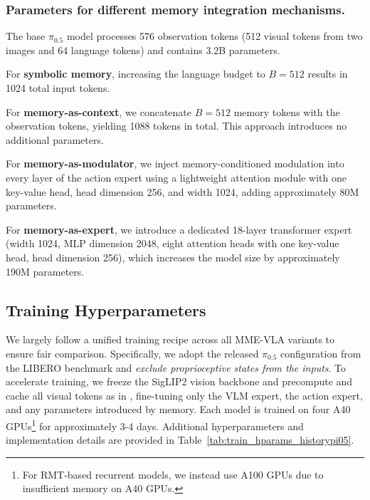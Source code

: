 \subsubsection{Parameters for different memory integration mechanisms.}

The base $\pi_{0.5}$ model processes 576 observation tokens (512 visual tokens from two images and 64 language tokens) and contains 3.2B parameters.

For \textbf{symbolic memory}, increasing the language budget to $B=512$ results in 1024 total input tokens.

For \textbf{memory-as-context}, we concatenate $B=512$ memory tokens with the observation tokens, yielding 1088 tokens in total. This approach introduces no additional parameters.

For \textbf{memory-as-modulator}, we inject memory-conditioned modulation into every layer of the action expert using a lightweight attention module with one key-value head, head dimension 256, and width 1024, adding approximately 80M parameters.

For \textbf{memory-as-expert}, we introduce a dedicated 18-layer transformer expert (width 1024, MLP dimension 2048, eight attention heads with one key-value head, head dimension 256), which increases the model size by approximately 190M parameters.


\clearpage
\subsection{Training Hyperparameters}
\label{sec:hyperpara}

We largely follow a unified training recipe across all MME-VLA variants to ensure fair comparison. Specifically, we adopt the released $\pi_{0.5}$ configuration from the LIBERO benchmark and \textit{exclude proprioceptive states from the inputs}. To accelerate training, we freeze the SigLIP2 vision backbone and precompute and cache all visual tokens as in \cite{longdp}, fine-tuning only the VLM expert, the action expert, and any parameters introduced by memory. Each model is trained on four A40 GPUs\footnote{For RMT-based recurrent models, we instead use A100 GPUs due to insufficient memory on A40 GPUs.} for approximately 3-4 days. Additional hyperparameters and implementation details are provided in Table~\ref{tab:train_hparams_historypi05}. 


